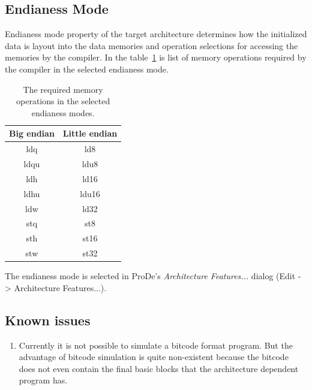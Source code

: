 \documentclass[twoside]{tceusermanual}
\begin{document}
\subsection{Endianess Mode}
\label{ss:endianess-mode}

Endianess mode property of the target architecture determines how the
initialized data is layout into the data memories and operation
selections for accessing the memories by the compiler. In the
table~\ref{table:mem-ops-for-endianess-modes} is list of memory
operations required by the compiler in the selected endianess
mode.

\begin{table}
\begin{center}
  \begin{tabular}{|c|c|}
    \hline
    Big endian & Little endian \\
    \hline
    ldq & ld8 \\
    ldqu & ldu8 \\
    ldh & ld16 \\
    ldhu & ldu16 \\
    ldw & ld32 \\
    stq & st8 \\
    sth & st16 \\
    stw & st32 \\
    \hline
  \end{tabular}
\end{center}
\caption{The required memory operations in the selected endianess modes.}
\label{table:mem-ops-for-endianess-modes}
\end{table}

The endianess mode is selected in ProDe's \emph{Architecture
  Features...}  dialog (Edit -> Architecture Features...).


\subsection{Known issues}
\label{sec:tceccIssues}
\begin{enumerate}

\item
Currently it is not possible to simulate a bitcode format program. But the
advantage of bitcode simulation is quite non-existent because the bitcode
does not even contain the final basic blocks that the architecture dependent
program has.
\end{enumerate}

\end{document}

